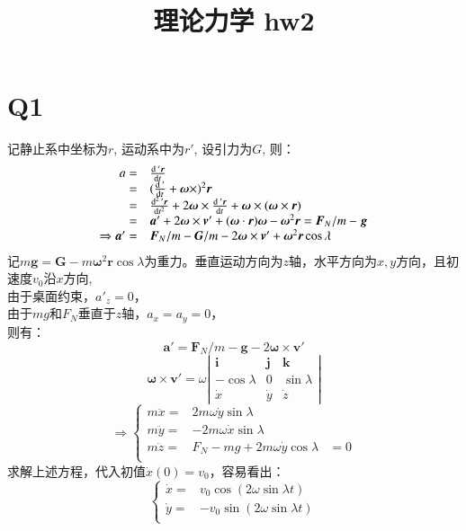 \documentclass[UTF8,9pt]{ctexart}
\title{理论力学 hw2}
\begin{document}
 
\maketitle 
\section{Q1}
    记静止系中坐标为$r$, 运动系中为$r'$, 设引力为$G$, 则：
    $$\begin{array}{rl}
        a=&\dt{\,'\bm{r}} \\   
         =&(\dt{ \,' }+\bm{\omega}\times)^2\bm{r}\\
         =&\dt[2]{\,'\bm{r}}+2 \bm{\omega} \times \dt{\,'\bm{r}}+\bm{\omega}\times(\bm{\omega}\times \bm{r})\\
         =&\bm{a}'+2\bm{\omega}\times \bm{v}'+(\bm{\omega}\cdot \bm{r})\bm{\omega}-\bm{\omega}^2\bm{r}=\bm{F}_N/m-\bm{g}\\  
         \Rightarrow \bm{a}'=&\bm{F}_N/m-\bm{G}/m-2\bm{\omega}\times \bm{v}'+\bm{\omega}^2\bm{r}\cos\lambda 
    \end{array}$$
    记$m\bm{g}=\bm{G}-m\bm{\omega}^2\bm{r}\cos\lambda$为重力。垂直运动方向为$z$轴，水平方向为$x,y$方向，且初速度$v_0$沿$x$方向, \\
    由于桌面约束，$a'_z=0$，\\
    由于$mg$和$F_N$垂直于$z$轴，$a_x=a_y=0$，\\则有：
    $$\bm{a}'=\bm{F}_N/m-\bm{g}-2\bm{\omega}\times \bm{v}'$$
    $$\bm{\omega}\times \bm{v}'=\omega\left|\begin{matrix}
        \bm{i} & \bm{j} & \bm{k}\\
        -\cos\lambda & 0 & \sin\lambda\\
        \dot{x} & \dot{y} & \dot{z}
    \end{matrix}\right|$$ 
    $$\Rightarrow \left\{\begin{array}{rll}
        m\ddot{x}=&2m\omega\dot{y}\sin\lambda\\
        m\ddot{y}=&-2m\omega \dot{x}\sin\lambda\\
        m\ddot{z}=&F_N-mg+2m\omega\dot{y}\cos\lambda&=0\\
    \end{array}\right.$$
    求解上述方程，代入初值$\dot{x}(0)=v_0$，容易看出：
    $$\left\{\begin{array}{rll}
        \dot{x}=&v_0\cos (2\omega\sin\lambda t)\\
        \dot{y}=&-v_0\sin (2\omega\sin\lambda t)\\
    \end{array}\right.$$
\end{document}

